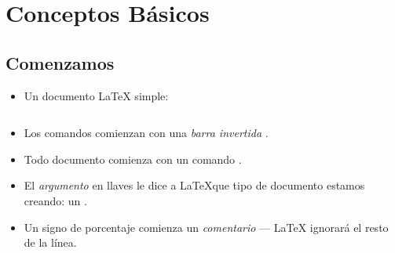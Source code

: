 \documentclass{beamer}
\begin{document}
\section{Conceptos Básicos}

\subsection{Comenzamos}
\begin{frame}[fragile]{\insertsubsection}
  \begin{itemize}
  \item Un documento \LaTeX{} simple:
    \inputminted[frame=single]{latex}{basics.tex}
  \item Los comandos comienzan con una \emph{barra invertida} \keystrokebftt{\bs}.
  \item Todo documento comienza con un comando .
  \item El \emph{argumento} en llaves \keystrokebftt{\{}
    \keystrokebftt{\}} le dice a \LaTeX que tipo de documento estamos
    creando: un .
  \item Un signo de porcentaje \keystrokebftt{\%} comienza un
    \emph{comentario} --- \LaTeX{} ignorará el resto de la línea.
  \end{itemize}
\end{frame}
\end{document}
